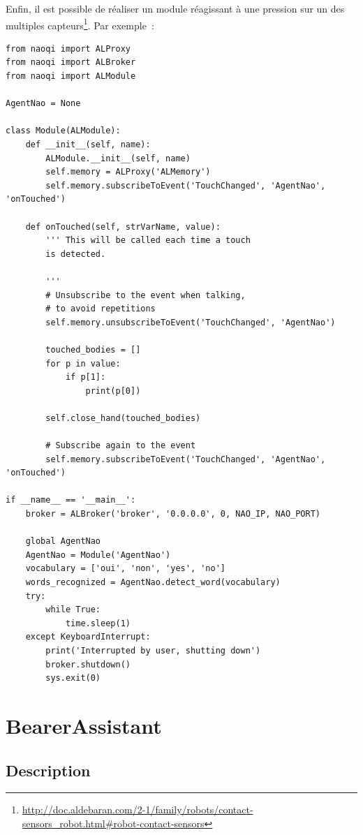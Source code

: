 \documentclass{article}
\begin{document}
Enfin, il est possible de réaliser un module réagissant à une pression sur un des multiples capteurs\footnote{\url{http://doc.aldebaran.com/2-1/family/robots/contact-sensors_robot.html#robot-contact-sensors}}. Par exemple~:

\begin{verbatim}
from naoqi import ALProxy
from naoqi import ALBroker
from naoqi import ALModule

AgentNao = None

class Module(ALModule):
    def __init__(self, name):
        ALModule.__init__(self, name)
        self.memory = ALProxy('ALMemory')
        self.memory.subscribeToEvent('TouchChanged', 'AgentNao', 'onTouched')

    def onTouched(self, strVarName, value):
        ''' This will be called each time a touch
        is detected.

        '''
        # Unsubscribe to the event when talking,
        # to avoid repetitions
        self.memory.unsubscribeToEvent('TouchChanged', 'AgentNao')

        touched_bodies = []
        for p in value:
            if p[1]:
                print(p[0])

        self.close_hand(touched_bodies)

        # Subscribe again to the event
        self.memory.subscribeToEvent('TouchChanged', 'AgentNao', 'onTouched')

if __name__ == '__main__':
    broker = ALBroker('broker', '0.0.0.0', 0, NAO_IP, NAO_PORT)

    global AgentNao
    AgentNao = Module('AgentNao')
    vocabulary = ['oui', 'non', 'yes', 'no']
    words_recognized = AgentNao.detect_word(vocabulary)
    try:
        while True:
            time.sleep(1)
    except KeyboardInterrupt:
        print('Interrupted by user, shutting down')
        broker.shutdown()
        sys.exit(0)
\end{verbatim}


\section{BearerAssistant}

\subsection{Description}
\end{document}
